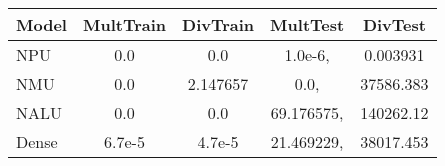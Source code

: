 \begin{tabular}{lcccc}
\toprule
Model & MultTrain & DivTrain & MultTest & DivTest\\
\midrule
NPU & 0.0 & 0.0 & 1.0e-6, & 0.003931 \\
NMU & 0.0 & 2.147657 & 0.0, & 37586.383 \\
NALU & 0.0 & 0.0 & 69.176575, & 140262.12 \\
Dense & 6.7e-5 & 4.7e-5 & 21.469229, & 38017.453 \\
\bottomrule
\end{tabular}
